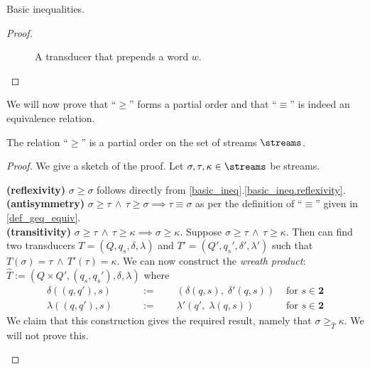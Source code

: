 \begin{proposition}{Basic inequalities.}
\begin{proof}
\begin{enumerate}
\begin{figure}[H]
				\centering
				\caption{A transducer that prepends a word $w$.}
				\label{fig:basic_ineq.prepend}
			\end{figure}
		\end{enumerate}
	\end{proof}
\end{proposition}

We will now prove that ``$\geq$'' forms a partial order and that ``$\equiv$'' is indeed an equivalence relation.

\begin{proposition}\label{poset_streams}
	The relation ``$\geq$'' is a partial order on the set of streams $\streams$.
	\begin{proof}
		We give a sketch of the proof.
		Let $\sigma,\tau,\kappa\in\streams$ be streams.
		\begin{sindent}
			\textbf{(reflexivity)} $\sigma \geq \sigma$ follows directly from \cref{basic_ineq}.\ref{basic_ineq.reflexivity}.\\
			\textbf{(antisymmetry)} $\sigma \geq \tau\,\land\,\tau \geq \sigma \implies \tau \equiv \sigma$ as per the definition of ``$\equiv$'' given in \cref{def_geq_equiv}.\\
			\textbf{(transitivity)} $\sigma \geq \tau\,\land\,\tau \geq \kappa \implies \sigma \geq \kappa$. Suppose $\sigma \geq \tau\,\land\, \tau \geq \kappa$. Then can find two transducers $T = (Q,q_s,\delta,\lambda)$ and $T' = (Q',q_s',\delta',\lambda')$ such that $T(\sigma) = \tau\,\land\, T'(\tau) = \kappa$. We can now construct the \textit{wreath product}: $\hat{T} := (Q\times Q',(q_s,q_s'),\delta,\lambda)$ where
			\begin{align*}
				\delta((q,q'),s) \qquad &:= \qquad (\delta(q,s),\;\delta'(q,s)) &\text{ for } s\in\textbf{2}\\
				\lambda((q,q'),s) \qquad &:= \qquad\lambda'(q',\;\lambda(q,s)) &\text{ for } s\in\textbf{2}
			\end{align*}
			We claim that this construction gives the required result, namely that $\sigma \geq_{\hat{T}} \kappa$. We will not prove this.
		\end{sindent}
	\end{proof}
\end{proposition}

